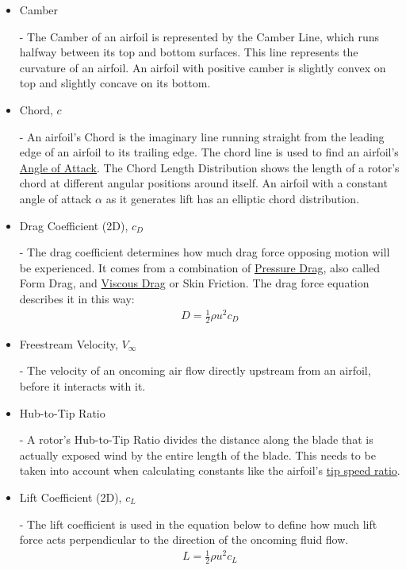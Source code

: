 \documentclass{article}
\begin{document}
\begin{itemize}
	\item \hypertarget{Camber}{Camber} - The Camber of an airfoil is represented by the Camber Line, which runs halfway between its top and bottom surfaces. This line represents the curvature of an airfoil. An airfoil with positive camber is slightly convex on top and slightly concave on its bottom.
	
	\item \hypertarget{c}{Chord, $c$} - An airfoil's Chord is the imaginary line running straight from the leading edge of an airfoil to its trailing edge. The chord line is used to find an airfoil's \hyperlink{alpha}{Angle of Attack}. The Chord Length Distribution shows the length of a rotor's chord at different angular positions around itself. An airfoil with a constant angle of attack $\alpha$ as it generates lift has an elliptic chord distribution.

	\item \hypertarget{CD}{Drag Coefficient (2D), $c_{D}$} - The drag coefficient determines how much drag force opposing motion will be experienced. It comes from a combination of \hyperlink{DP}{Pressure Drag}, also called Form Drag, and \hyperlink{VD}{Viscous Drag} or Skin Friction. The drag force equation describes it in this way: 
		\begin{equation} \label{eq:13}
		\begin{aligned}
        			D = \frac{1}{2} \rho u^{2} c_{D}
	    	\end{aligned}
		\end{equation}
	
	\item \hypertarget{Vinf}{Freestream Velocity, $V_{\infty}$} - The velocity of an oncoming air flow directly upstream from an airfoil, before it interacts with it.
	
	\item \hypertarget{D/D}{Hub-to-Tip Ratio} - A rotor's Hub-to-Tip Ratio divides the distance along the blade that is actually exposed wind by the entire length of the blade. This needs to be taken into account when calculating constants like the airfoil's \hyperlink{lambda}{tip speed ratio}.
		
	\item \hypertarget{CL}{Lift Coefficient (2D), $c_{L}$} - The lift coefficient is used in the equation below to define how much lift force acts perpendicular to the direction of the oncoming fluid flow.
		\begin{equation} \label{eq:14}
		\begin{aligned}
        			L = \frac{1}{2} \rho u^{2} c_{L}
	    	\end{aligned}
		\end{equation}
	

\end{itemize}
\end{document}
